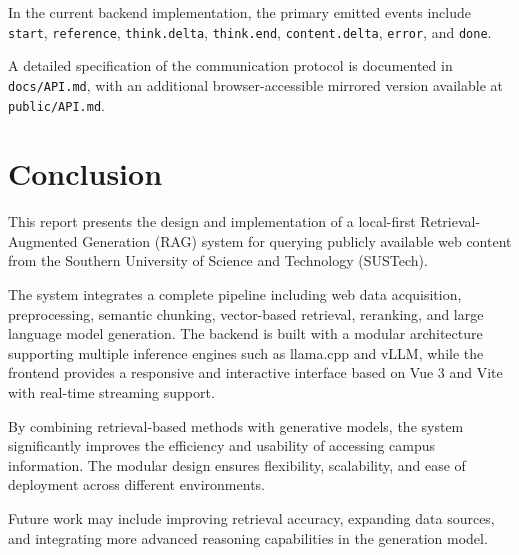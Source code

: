 In the current backend implementation, the primary emitted events include \texttt{start}, \texttt{reference}, \texttt{think.delta}, \texttt{think.end}, \texttt{content.delta}, \texttt{error}, and \texttt{done}.

A detailed specification of the communication protocol is documented in \texttt{docs/API.md}, with an additional browser-accessible mirrored version available at \texttt{public/API.md}.


\chapter{Conclusion}

This report presents the design and implementation of a local-first Retrieval-Augmented Generation (RAG) system for querying publicly available web content from the Southern University of Science and Technology (SUSTech).

The system integrates a complete pipeline including web data acquisition, preprocessing, semantic chunking, vector-based retrieval, reranking, and large language model generation. The backend is built with a modular architecture supporting multiple inference engines such as llama.cpp and vLLM, while the frontend provides a responsive and interactive interface based on Vue 3 and Vite with real-time streaming support.

By combining retrieval-based methods with generative models, the system significantly improves the efficiency and usability of accessing campus information. The modular design ensures flexibility, scalability, and ease of deployment across different environments.

Future work may include improving retrieval accuracy, expanding data sources, and integrating more advanced reasoning capabilities in the generation model.


